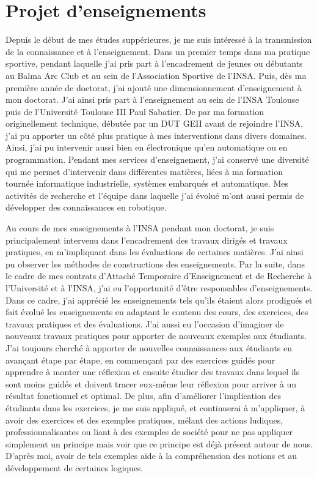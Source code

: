 
\section{Projet d'enseignements}

Depuis le début de mes études suppérieures, je me suis intéressé à la transmission de la connaissance et à l'enseignement. Dans un premier temps dans ma pratique sportive, pendant laquelle j'ai pris part à l'encadrement de jeunes ou débutants au Balma Arc Club et au sein de l'Association Sportive de l'INSA. Puis, dès ma première année de doctorat, j'ai ajouté une dimensionnement d'enseignement à mon doctorat. J'ai ainsi pris part à l'enseignement au sein de l'INSA Toulouse puis de l'Université Toulouse III Paul Sabatier. De par ma formation originellement technique, débutée par un DUT GEII avant de rejoindre l'INSA, j'ai pu apporter un côté plus pratique à mes interventions dans divers domaines. Ainsi, j'ai pu intervenir aussi bien en électronique qu'en automatique ou en programmation. Pendant mes services d'enseignement, j'ai conservé une diversité qui me permet d'intervenir dans différentes matières, liées à ma formation tournée informatique industrielle, systèmes embarqués et automatique. Mes activités de recherche et l'équipe dans laquelle j'ai évolué m'ont aussi permis de développer des connaissances en robotique.

Au cours de mes enseignements à l'INSA pendant mon doctorat, je suis principalement intervenu dans l'encadrement des travaux dirigés et travaux pratiques, en m'impliquant dans les évaluations de certaines matières. J'ai ainsi pu observer les méthodes de constructions des enseignements. Par la suite, dans le cadre de mes contrats d'Attaché Temporaire d'Enseignement et de Recherche à l'Université et à l'INSA, j'ai eu l'opportunité d'être responsables d'enseignements. Dans ce cadre, j'ai apprécié les enseignements tels qu'ils étaient alors prodigués et fait évolué les enseignements en adaptant le contenu des cours, des exercices, des travaux pratiques et des évaluations. J'ai aussi eu l'occasion d'imaginer de nouveaux travaux pratiques pour apporter de nouveaux exemples aux étudiants. J'ai toujours cherché à apporter de nouvelles connaissances aux étudiants en avançant étape par étape, en commençant par des exercices guidés pour apprendre à monter une réflexion et ensuite étudier des travaux dans lequel ils sont moins guidés et doivent tracer eux-même leur réflexion pour arriver à un résultat fonctionnel et optimal. De plus, afin d'améliorer l'implication des étudiants dans les exercices, je me suis appliqué, et continuerai à m'appliquer, à avoir des exercices et des exemples pratiques, mélant des actions ludiques, professionnalisantes ou liant à des exemples de société pour ne pas appliquer simplement un principe mais voir que ce principe est déjà présent autour de nous. D'après moi, avoir de tels exemples aide à la compréhension des notions et au développement de certaines logiques.

